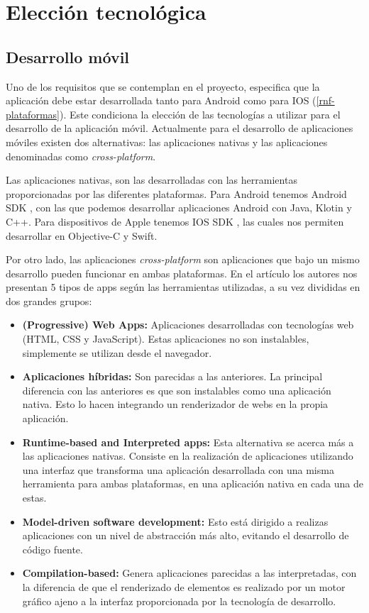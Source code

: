 \section{Elección tecnológica}

\subsection{Desarrollo móvil}

Uno de los requisitos que se contemplan en el proyecto, especifica que la aplicación debe estar desarrollada tanto para Android como para IOS (\ref{rnf-plataformas}). Este condiciona la elección de las tecnologías a utilizar para el desarrollo de la aplicación móvil. Actualmente para el desarrollo de aplicaciones móviles existen dos alternativas: las aplicaciones nativas y las aplicaciones denominadas como \textit{cross-platform}.

Las aplicaciones nativas, son las desarrolladas con las herramientas proporcionadas por las diferentes plataformas. Para Android tenemos Android SDK \cite{android-sdk}, con las que podemos desarrollar aplicaciones Android con Java, Klotin y C++. Para dispositivos de Apple tenemos IOS SDK \cite{ios-sdk}, las cuales nos permiten desarrollar en Objective-C y Swift. 

Por otro lado, las aplicaciones \textit{cross-platform} son aplicaciones que bajo un mismo desarrollo pueden funcionar en ambas plataformas. En el artículo \cite{cross-platform-comparacion} los autores nos presentan 5 tipos de apps según las herramientas utilizadas, a su vez divididas en dos grandes grupos:

\begin{itemize}
    \item \textbf{(Progressive) Web Apps:} Aplicaciones desarrolladas con tecnologías web (HTML, CSS y JavaScript). Estas aplicaciones no son instalables, simplemente se utilizan desde el navegador.
    \item \textbf{Aplicaciones híbridas:} Son parecidas a las anteriores. La principal diferencia con las anteriores es que son instalables como una aplicación nativa. Esto lo hacen integrando un renderizador de webs en la propia aplicación. 
    \item \textbf{Runtime-based and Interpreted apps:} Esta alternativa se acerca más a las aplicaciones nativas. Consiste en la realización de aplicaciones utilizando una interfaz que transforma una aplicación desarrollada con una misma herramienta para ambas plataformas, en una aplicación nativa en cada una de estas. 
    \item \textbf{Model-driven software development:} Esto está dirigido a realizas aplicaciones con un nivel de abstracción más alto, evitando el desarrollo de código fuente.
    \item \textbf{Compilation-based:} Genera aplicaciones parecidas a las interpretadas, con la diferencia de que el renderizado de elementos es realizado por un motor gráfico ajeno a la interfaz proporcionada por la tecnología de desarrollo.
\end{itemize}

